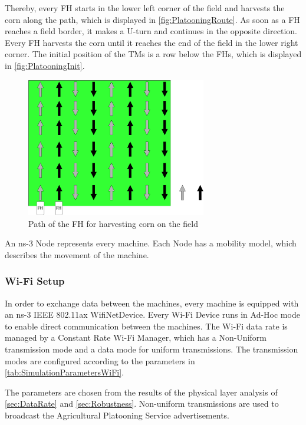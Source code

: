 Thereby, every \ac{FH} starts in the lower left corner of the field and harvests the corn along the path,
which is displayed in \autoref{fig:PlatooningRoute}.
As soon as a \ac{FH} reaches a field border, it makes a U-turn and continues
in the opposite direction.
Every \ac{FH} harvests the corn until it reaches the end of the field in the lower right corner.
The initial position of the \ac{TM}s is a row below the \ac{FH}s, which is displayed in \autoref{fig:PlatooningInit}.
\begin{figure}[H]%
   \centering
   \includegraphics[width=0.7\textwidth]{figures/drawings-Route}
   \caption{Path of the \acf{FH} for harvesting corn on the field}
   \label{fig:PlatooningRoute}%
\end{figure}

An ns-3 Node represents every machine.
Each Node has a mobility model, which describes the movement of the machine.

\subsubsection*{Wi-Fi Setup}
In order to exchange data between the machines, every machine is equipped with an  ns-3 IEEE 802.11ax WifiNetDevice.
Every Wi-Fi Device runs in Ad-Hoc mode to enable direct communication
between the machines.
The Wi-Fi data rate is managed by a Constant Rate Wi-Fi Manager, which has a Non-Uniform
transmission mode and a data mode for uniform transmissions.
The transmission modes are configured according
to the parameters in \autoref{tab:SimulationParametersWiFi}.

The parameters are chosen from the results of the physical layer analysis of \autoref{sec:DataRate} and \autoref{sec:Robustness}.
Non-uniform transmissions are used to broadcast the Agricultural Platooning Service advertisements.


